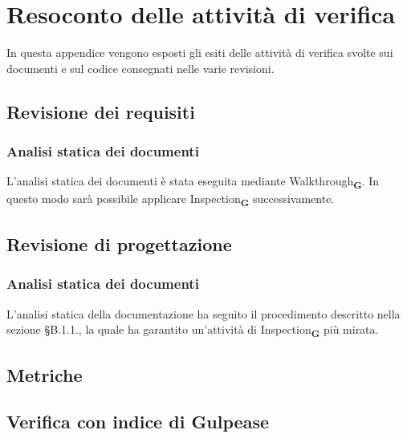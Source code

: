 \section{Resoconto delle attività di verifica}
In questa appendice vengono esposti gli esiti delle attività di verifica svolte sui documenti e sul codice consegnati nelle varie revisioni.
\subsection{Revisione dei requisiti}
\subsubsection{Analisi statica dei documenti}
L'analisi statica dei documenti è stata eseguita mediante Walkthrough\textsubscript{\textbf{G}}. In questo modo sarà possibile applicare Inspection\textsubscript{\textbf{G}} successivamente.
\subsection{Revisione di progettazione}
\subsubsection{Analisi statica dei documenti}
L'analisi statica della documentazione ha seguito il procedimento descritto nella sezione §B.1.1., la quale ha garantito un'attività di Inspection\textsubscript{\textbf{G}} più mirata.
\subsection{Metriche}
\subsection{Verifica con indice di Gulpease}

